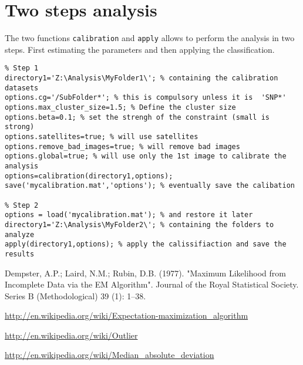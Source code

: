 \documentclass{scrartcl}
\begin{document}
\section{Two steps analysis}
The two functions \texttt{calibration} and \texttt{apply} allows to
perform the analysis in two steps. First estimating the parameters and
then applying the classification.
\begin{lstlisting}
% Step 1
directory1='Z:\Analysis\MyFolder1\'; % containing the calibration datasets
options.cg='/SubFolder*'; % this is compulsory unless it is  'SNP*'
options.max_cluster_size=1.5; % Define the cluster size
options.beta=0.1; % set the strengh of the constraint (small is strong)
options.satellites=true; % will use satellites
options.remove_bad_images=true; % will remove bad images
options.global=true; % will use only the 1st image to calibrate the analysis
options=calibration(directory1,options);
save('mycalibration.mat','options'); % eventually save the calibation

% Step 2
options = load('mycalibration.mat'); % and restore it later
directory1='Z:\Analysis\MyFolder2\'; % containing the folders to analyze
apply(directory1,options); % apply the calissifiaction and save the results
\end{lstlisting}


\begin{thebibliography}{2}

 Dempster, A.P.; Laird, N.M.; Rubin,
  D.B. (1977). "Maximum Likelihood from Incomplete Data via the EM
  Algorithm". Journal of the Royal Statistical Society. Series B
  (Methodological) 39 (1): 1–38.

 \url{http://en.wikipedia.org/wiki/Expectation-maximization\_algorithm}

 \url{http://en.wikipedia.org/wiki/Outlier}
   
 \url{http://en.wikipedia.org/wiki/Median\_absolute\_deviation}

\end{thebibliography}
\end{document}
